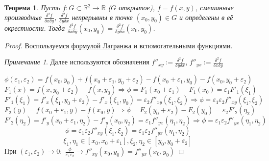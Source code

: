 \documentclass{article}
\theoremstyle{indented}
\newtheorem{theorem}{Теорема}
\theoremstyle{definition}
\theoremstyle{remark}
\newtheorem{remark}{Примечание}
\begin{document}
\begin{theorem}
    Пусть $f: G\subset \mathbb{R}^2 \to \mathbb{R}$ ($G$ открытое), $f=f(x,y)$,
    смешанные производные $\frac{\delta^2 f}{\delta x \delta y}$,
    $\frac{\delta^2 f}{\delta y \delta x}$ непрерывны в точке $(x_0,y_0)\in G$ и определены в её окрестности.
    Тогда $\frac{\delta^2 f}{\delta x \delta y} (x_0,y_0) = \frac{\delta^2 f}{\delta y \delta x} (x_0,y_0)$.
\end{theorem}

\begin{proof}
    Воспользуемся \hyperlink{lagrange}{формулой Лагранжа} и вспомогательными функциями.
    

    \begin{remark}
        Далее используются обозначения
        $f''_{xy}:=\frac{\delta^2 f}{\delta y \delta x}$,
        $f''_{yx}:=\frac{\delta^2 f}{\delta x \delta y}$
    \end{remark}

    \[\phi(\varepsilon_1, \varepsilon_2) =
        f(x_0, y_0)+f(x_0+\varepsilon_1, y_0+\varepsilon_2)
        -f(x_0+\varepsilon_1, y_0)-f(x_0, y_0+\varepsilon_2)\]
    \[F_1(x)=f(x,y_0+\varepsilon_2)-f(x,y_0)
        \Rightarrow \phi = F_1(x_0+\varepsilon_1)-F_1(x_0) = \varepsilon_1 F'_1(\xi_1)\]
    \[F'_1(\xi_1)=f'_x(\xi _1, y_0+\varepsilon_2)-f'_x(\xi_1,y_0)=
        \varepsilon_2 f''_{xy}(\xi_1, \xi_2)
        \Rightarrow \phi = \varepsilon_1 \varepsilon_2 f''_{xy}(\xi_1, \xi_2)\]
    \[F_2(y)=f(x_0+\varepsilon_1,y)-f(x_0,y)
        \Rightarrow \phi = F_2(y_0+\varepsilon_2)-F_2(y_0) = \varepsilon_2 F'_2(\eta_2)\]
    \[F'_2(\eta_2)=f'_y(x_0+\varepsilon_1,\eta_2)-f'_y(x_0,\eta_2)=
        \varepsilon_1 f''_{yx}(\eta_1, \eta_2)
        \Rightarrow \phi = \varepsilon_1 \varepsilon_2 f''_{yx}(\eta_1, \eta_2)\]
    \[\phi = \varepsilon_1 \varepsilon_2 f''_{xy}(\xi_1, \xi_2) = \varepsilon_1 \varepsilon_2 f''_{yx}(\eta _1, \eta _2) \]
    \[\xi_1,\eta_1 \in [x_0, x_0+\varepsilon_1], \xi_2,\eta_2 \in [y_0, y_0+\varepsilon_2]\]
    При $(\varepsilon_1, \varepsilon_2) \to 0:$
    $\frac{\phi}{\varepsilon_1 \varepsilon_2} \to f''_{xy}(x_0, y_0) = f''_{yx}(x_0, y_0)$
\end{proof}
\end{document}
